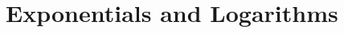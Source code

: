 \documentclass[../precalc.tex]{subfiles}
\begin{document}
\chapter{Exponentials and Logarithms}
\end{document}

